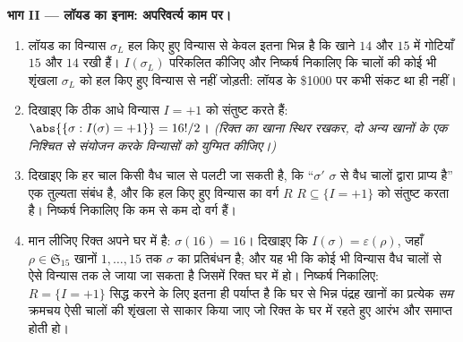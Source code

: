 \begin{problem}
\medskip
\noindent\textbf{भाग II --- लॉयड का इनाम: अपरिवर्त्य काम पर।}
\begin{enumerate}[resume]
  \item लॉयड का विन्यास $\sigma_L$ हल किए हुए विन्यास से केवल इतना भिन्न है
        कि खाने $14$ और $15$ में गोटियाँ $15$ और $14$ रखी हैं। $I(\sigma_L)$
        परिकलित कीजिए और निष्कर्ष निकालिए कि चालों की कोई भी शृंखला
        $\sigma_L$ को हल किए हुए विन्यास से नहीं जोड़ती: लॉयड के \$1000 पर
        कभी संकट था ही नहीं।
  \item दिखाइए कि ठीक आधे विन्यास $I =
        +1$ को संतुष्ट करते हैं: $\abs{\{\sigma : I(\sigma) = +1\}} = 16!/2$।
        \emph{(रिक्त का खाना स्थिर रखकर, दो अन्य खानों के एक निश्चित
         से संयोजन करके विन्यासों को युग्मित कीजिए।)}
  \item दिखाइए कि हर चाल किसी वैध चाल से पलटी जा सकती है, कि ``$\sigma'$
        $\sigma$ से वैध चालों द्वारा प्राप्य है'' एक तुल्यता संबंध है, और
        कि हल किए हुए विन्यास का वर्ग $R$ $R \subseteq \{I = +1\}$ को संतुष्ट करता है।
        निष्कर्ष निकालिए कि कम से कम दो वर्ग हैं।
  \item मान लीजिए रिक्त अपने घर में है: $\sigma(16) = 16$। दिखाइए कि $I(\sigma) = \varepsilon(\rho)$, जहाँ
        $\rho \in
        \mathfrak{S}_{15}$ खानों $1, \dots, 15$ तक $\sigma$ का प्रतिबंधन है; और यह भी कि कोई भी
        विन्यास वैध चालों से ऐसे विन्यास तक ले जाया जा सकता है जिसमें
        रिक्त घर में हो। निष्कर्ष निकालिए: $R = \{I = +1\}$ सिद्ध करने के लिए
        इतना ही पर्याप्त है कि घर से भिन्न पंद्रह खानों का प्रत्येक
        \emph{सम} क्रमचय ऐसी चालों की शृंखला से साकार किया जाए जो
        रिक्त के घर में रहते हुए आरंभ और समाप्त होती हो।
\end{enumerate}


\end{problem}
